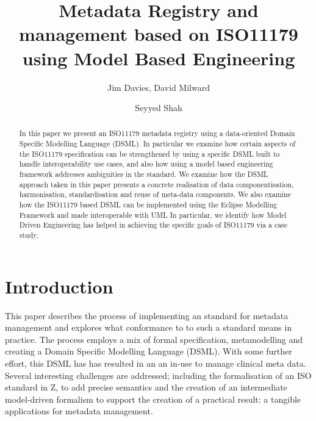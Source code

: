 \documentclass{llncs}
\begin{document}
\title{Metadata Registry and management based on ISO11179 using Model Based Engineering}

\author{Jim Davies, David Milward \and Seyyed Shah}
\maketitle

\begin{abstract}
In this paper we present an ISO11179 metadata registry using a data-oriented Domain Specific Modelling Language (DSML). In particular we examine how certain aspects of the ISO11179 specification can be strengthened by using a specific DSML built to handle interoperability use cases, and also how using a model based engineering framework addresses ambiguities in the standard. We examine how the DSML approach taken in this paper presents a concrete realisation of data componentisation, harmonisation, standardisation and reuse of meta-data components. We also examine how the ISO11179 based DSML can be implemented using the Eclipse Modelling Framework and made interoperable with UML In particular, we identify how Model Driven Engineering has helped in achieving the specific goals of ISO11179 via a case study.

\end{abstract}


\noindent

\section{Introduction}

This paper describes the process of implementing an standard for metadata management and explores what conformance to to such a standard means in practice. The process employs a mix of formal specification, metamodelling and creating a Domain Specific Modelling Language (DSML). With some further effort, this DSML has has resulted in an an in-use to manage clinical meta data. Several interesting challenges are addressed; including the formalisation of an ISO standard in Z, to add precise semantics and the creation of an intermediate model-driven formalism to support the creation of a practical result: a tangible applications for metadata management.
\end{document}
